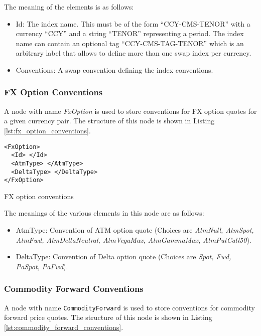 The meaning of the elements is as follows:

\begin{itemize}
\item Id: The index name. This must be of the form ``CCY-CMS-TENOR'' with a currency ``CCY'' and a string ``TENOR''
  representing a period. The index name can contain an optional tag ``CCY-CMS-TAG-TENOR'' which is an arbitrary label
  that allows to define more than one swap index per currency.
\item Conventions: A swap convention defining the index conventions.
\end{itemize}

\subsubsection{FX Option Conventions} 
A node with name \emph{FxOption} is used to store conventions for FX option quotes for a given currency pair. The 
structure of this node is shown in Listing \ref{lst:fx_option_conventions}. 
 
\begin{listing}[H] 
\begin{verbatim} 
<FxOption> 
  <Id> </Id> 
  <AtmType> </AtmType> 
  <DeltaType> </DeltaType> 
</FxOption> 
\end{verbatim} 
\caption{FX option conventions} 
\label{lst:fx_option_conventions} 
\end{listing} 
 
 
The meanings of the various elements in this node are as follows: 
\begin{itemize} 
\item AtmType: Convention of ATM option quote (Choices are {\em AtmNull, AtmSpot, AtmFwd, 
AtmDeltaNeutral, AtmVegaMax, AtmGammaMax, AtmPutCall50}). 
\item DeltaType: Convention of Delta option quote (Choices are {\em Spot, Fwd, PaSpot, 
PaFwd}). 
\end{itemize} 

\subsubsection{Commodity Forward Conventions}
A node with name \lstinline!CommodityForward! is used to store conventions for commodity forward price quotes. The
structure of this node is shown in Listing \ref{lst:commodity_forward_conventions}.

